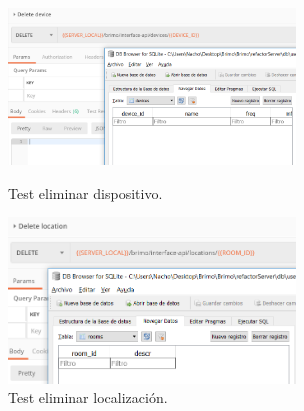 \begin{figure}[!htb]
\includegraphics[width=3.00in]{images/tests/screenshots/13deletedevice.PNG}
\caption{Test eliminar dispositivo.}
\endminipage\hfill
{}
\includegraphics[width=3.00in]{images/tests/screenshots/14deletelocation.PNG}
\caption{Test eliminar localización.}
\endminipage\hfill
\end{figure}



\newpage \thispagestyle{empty} %